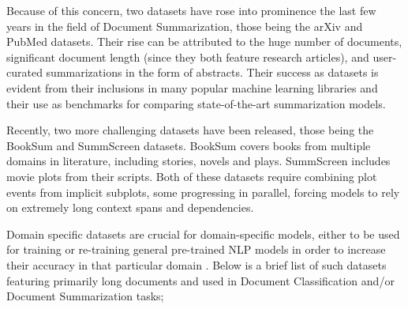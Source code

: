 \documentclass[preprint,review,12pt]{elsarticle}
\begin{document}
Because of this concern, two datasets have rose into prominence the last few years in the field of Document Summarization, those being the arXiv \cite{clement} \cite{gong} and PubMed \cite{sumpubmed} \cite{franck} datasets. Their rise can be attributed to the huge number of documents, significant document length (since they both feature research articles), and user-curated summarizations in the form of abstracts. Their success as datasets is evident from their inclusions in many popular machine learning libraries \cite{tf_datasets} \cite{kaggle_arxiv} \cite{hugging_face_arxiv} \cite{hugging_face_pubmed} and their use as benchmarks for comparing state-of-the-art summarization models. 

Recently, two more challenging datasets have been released, those being the BookSum \cite{poland} and SummScreen \cite{summset} datasets. BookSum covers books from multiple domains in literature, including stories, novels and plays. SummScreen includes movie plots from their scripts. Both of these datasets require combining plot events from implicit subplots, some progressing in parallel, forcing models to rely on extremely long context spans and dependencies.

Domain specific datasets are crucial for domain-specific models, either to be used for training or re-training general pre-trained NLP models in order to increase their accuracy in that particular domain \cite{dai}. Below is a brief list of such datasets featuring primarily long documents and used in Document Classification and/or Document Summarization tasks;
\end{document}
